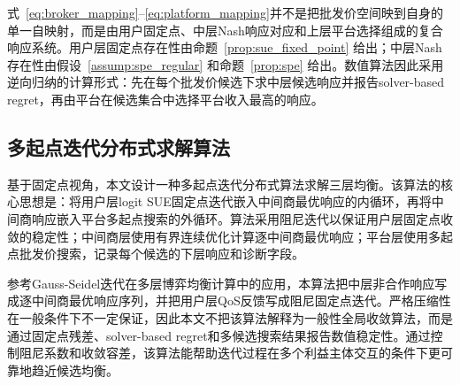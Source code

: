 \documentclass[UTF8,11pt]{ctexart}
\begin{document}
式~\eqref{eq:broker_mapping}--\eqref{eq:platform_mapping}并不是把批发价空间映到自身的单一自映射，而是由用户固定点、中层Nash响应对应和上层平台选择组成的复合响应系统。用户层固定点存在性由命题~\ref{prop:sue_fixed_point} 给出；中层Nash存在性由假设~\ref{assump:spe_regular} 和命题~\ref{prop:spe} 给出。数值算法因此采用逆向归纳的计算形式：先在每个批发价候选下求中层候选响应并报告solver-based regret，再由平台在候选集合中选择平台收入最高的响应。

\subsection{多起点迭代分布式求解算法}
\label{sec:algorithm}

基于固定点视角，本文设计一种多起点迭代分布式算法求解三层均衡。该算法的核心思想是：将用户层logit SUE固定点迭代嵌入中间商最优响应的内循环，再将中间商响应嵌入平台多起点搜索的外循环。算法采用阻尼迭代以保证用户层固定点收敛的稳定性；中间商层使用有界连续优化计算逐中间商最优响应；平台层使用多起点批发价搜索，记录每个候选的下层响应和诊断字段。

参考Gauss-Seidel迭代在多层博弈均衡计算中的应用\cite{wang2026hierarchical}，本算法把中层非合作响应写成逐中间商最优响应序列，并把用户层QoS反馈写成阻尼固定点迭代。严格压缩性在一般条件下不一定保证，因此本文不把该算法解释为一般性全局收敛算法，而是通过固定点残差、solver-based regret和多候选搜索结果报告数值稳定性。通过控制阻尼系数和收敛容差，该算法能帮助迭代过程在多个利益主体交互的条件下更可靠地趋近候选均衡。
\end{document}
